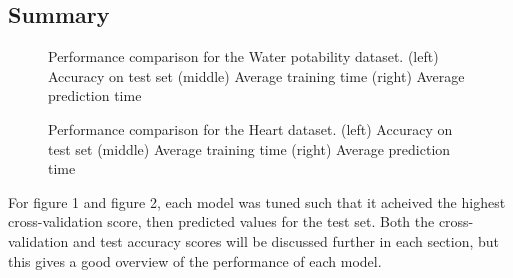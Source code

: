 \documentclass[
	letterpaper, %
]{mlreport}
\begin{document}
\subsection{Summary}
\begin{figure}
	\centering
	{}
	\caption{Performance comparison for the Water potability dataset. (left) Accuracy on test set (middle) Average training time (right) Average prediction time}
	\label{fig:fig1}
\end{figure}
\begin{figure}
	\centering
	{}
	\caption{Performance comparison for the Heart dataset. (left) Accuracy on test set (middle) Average training time (right) Average prediction time}
	\label{fig:fig2}
\end{figure}

For figure 1 and figure 2, each model was tuned such that it acheived the highest cross-validation score, then predicted values for the test set. Both the cross-validation and test accuracy scores will be discussed further in each section, but this gives a good overview of the performance of each model.
\end{document}
